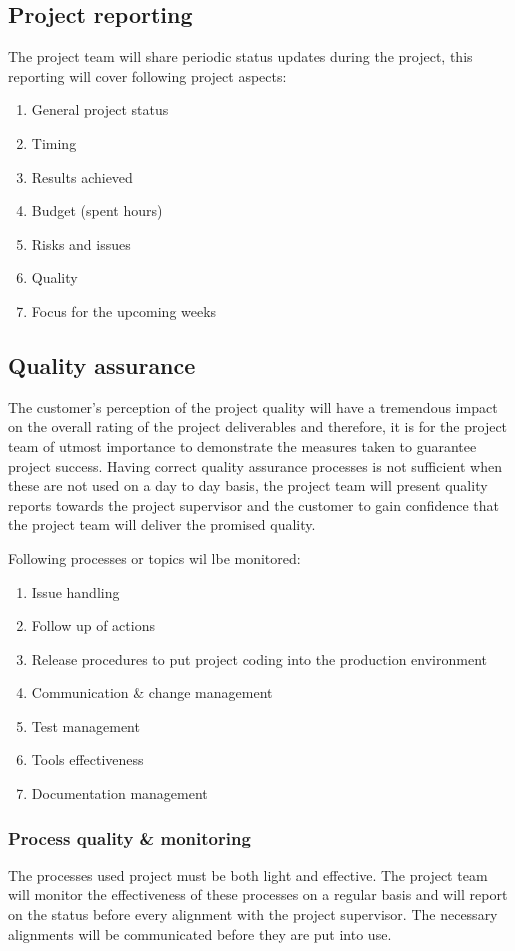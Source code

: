 \subsection{Project reporting}
The project team will share periodic status updates during the project, this reporting will cover following project aspects:
\begin{enumerate}
	\item General project status
	\item Timing
	\item Results achieved
	\item Budget (spent hours)
	\item Risks and issues
	\item Quality
	\item Focus for the upcoming weeks
\end {enumerate}

\subsection{Quality assurance}
The customer's perception of the project quality will have a tremendous impact on the overall rating of the project deliverables and therefore, it is for the project team of utmost importance to demonstrate the measures taken to guarantee project success. Having correct quality assurance processes is not sufficient when these are not used on a day to day basis, the project team will present quality reports towards the project supervisor and the customer to gain confidence that the project team will deliver the promised quality.

Following processes or topics wil lbe monitored: 
\begin{enumerate}
	\item Issue handling
	\item Follow up of actions
	\item Release procedures to put project coding into the production environment
	\item Communication \& change management
	\item Test management
	\item Tools effectiveness
	\item Documentation management
\end {enumerate}

\subsubsection{Process quality \& monitoring}
The processes used project must be both light and effective. 
The project team will monitor the effectiveness of these processes on a regular basis and will report on the status before every alignment with the project supervisor. The necessary alignments will be communicated before they are put into use.


